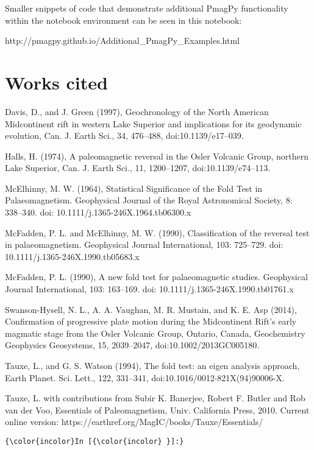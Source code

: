 \documentclass{article}
\begin{document}
Smaller snippets of code that demonstrate additional PmagPy
functionality within the notebook environment can be seen in this
notebook:

http://pmagpy.github.io/Additional\_PmagPy\_Examples.html

\section{Works cited}\label{works-cited}

Davis, D., and J. Green (1997), Geochronology of the North American
Midcontinent rift in western Lake Superior and implications for its
geodynamic evolution, Can. J. Earth Sci., 34, 476--488,
doi:10.1139/e17--039.

Halls, H. (1974), A paleomagnetic reversal in the Osler Volcanic Group,
northern Lake Superior, Can. J. Earth Sci., 11, 1200--1207,
doi:10.1139/e74--113.

McElhinny, M. W. (1964), Statistical Significance of the Fold Test in
Palaeomagnetism. Geophysical Journal of the Royal Astronomical Society,
8: 338--340. doi: 10.1111/j.1365-246X.1964.tb06300.x

McFadden, P. L. and McElhinny, M. W. (1990), Classification of the
reversal test in palaeomagnetism. Geophysical Journal International,
103: 725--729. doi: 10.1111/j.1365-246X.1990.tb05683.x

McFadden, P. L. (1990), A new fold test for palaeomagnetic studies.
Geophysical Journal International, 103: 163--169. doi:
10.1111/j.1365-246X.1990.tb01761.x

Swanson-Hysell, N. L., A. A. Vaughan, M. R. Mustain, and K. E. Asp
(2014), Confirmation of progressive plate motion during the Midcontinent
Rift's early magmatic stage from the Osler Volcanic Group, Ontario,
Canada, Geochemistry Geophysics Geosystems, 15, 2039--2047,
doi:10.1002/2013GC005180.

Tauxe, L., and G. S. Watson (1994), The fold test: an eigen analysis
approach, Earth Planet. Sci. Lett., 122, 331--341,
doi:10.1016/0012-821X(94)90006-X.

Tauxe, L. with contributions from Subir K. Banerjee, Robert F. Butler
and Rob van der Voo, Essentials of Paleomagnetism, Univ. California
Press, 2010. Current online version:
https://earthref.org/MagIC/books/Tauxe/Essentials/

    \begin{Verbatim}[commandchars=\\\{\}]
{\color{incolor}In [{\color{incolor} }]:} 
\end{Verbatim}


    
    
    
    
\end{document}
